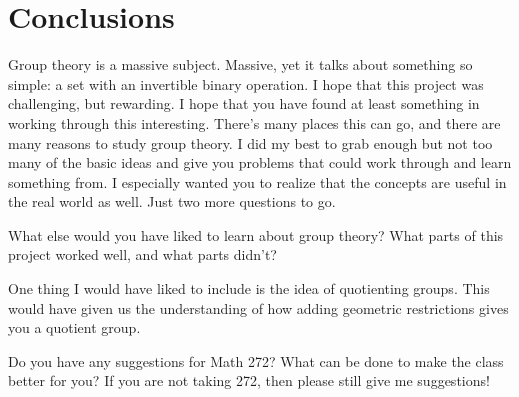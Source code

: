 \documentclass{article}
\theoremstyle{indented}
\begin{document}
\section{Conclusions}

Group theory is a massive subject. Massive, yet it talks about something so simple: a set with an invertible binary operation. I hope that this project was challenging, but rewarding. I hope that you have found at least something in working through this interesting. There's many places this can go, and there are many reasons to study group theory. I did my best to grab enough but not too many of the basic ideas and give you problems that could work through and learn something from. I especially wanted you to realize that the concepts are useful in the real world as well. Just two more questions to go.

\begin{problem}{}{}
What else would you have liked to learn about group theory? What parts of this project worked well, and what parts didn't?
\end{problem}

One thing I would have liked to include is the idea of quotienting groups. This would have given us the understanding of how adding geometric restrictions gives you a quotient group.

\begin{problem}{}{}
Do you have any suggestions for Math 272? What can be done to make the class better for you? If you are not taking 272, then please still give me suggestions!
\end{problem}
\end{document}
